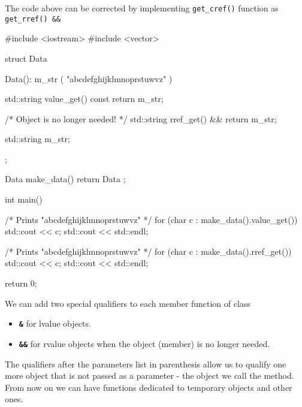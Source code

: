 \documentclass[../main]{subfiles}
\begin{document}
    The code above can be corrected by implementing \texttt{get\_cref()} function as \texttt{get\_rref() \&\&}
\begin{Code}
    #include <iostream>
    #include <vector>

    struct Data
    {
        Data():
            m_str ( "abcdefghijklmnoprstuwvz" )
        {
        }
    
        std::string value_get() const
        {
            return m_str;
        }

        /* Object is no longer needed! */
        std::string rref_get() &&
        {
            return m_str;
        }
    
        std::string m_str;
    };
    
    Data make_data()
    {
        return Data {};
    }
    
    int main()
    {
        /* Prints "abcdefghijklmnoprstuwvz" */
        for (char c : make_data().value_get())
        {
            std::cout << c;
        }
        std::cout << std::endl;
    
        /* Prints "abcdefghijklmnoprstuwvz" */
        for (char c : make_data().rref_get())
        {
            std::cout << c;
        }
        std::cout << std::endl;
    
        return 0;
    }
\end{Code}

    We can add two special qualifiers to each member function of class
\begin{itemize}
    \item \textbf{\texttt{\&}} for lvalue objects.
    \item \textbf{\texttt{\&\&}} for rvalue objects when the object (member) is no longer needed.
\end{itemize}
\noindent
The qualifiers after the parameters list in parenthesis allow us to qualify one more object that is not passed
as a parameter - the object we call the method. From now on we can have functions dedicated to temporary objects
and other ones.
\end{document}
